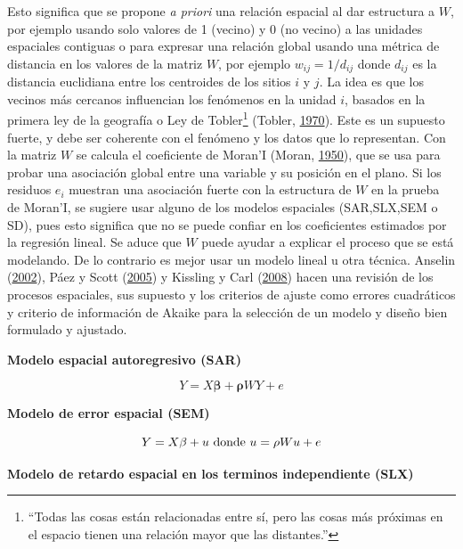 \documentclass[12pt,a4paper,oneside, openany]{book}
\let\rmarkdownfootnote\footnote%
\def\footnote{\protect\rmarkdownfootnote}
\theoremstyle{definition}
\theoremstyle{definition}
\theoremstyle{definition}
\theoremstyle{remark}
\begin{document}
Esto significa que se propone \emph{a priori} una relación espacial al
dar estructura a \(W\), por ejemplo usando solo valores de 1 (vecino) y
0 (no vecino) a las unidades espaciales contiguas o para expresar una
relación global usando una métrica de distancia en los valores de la
matriz \(W\), por ejemplo \(w_{ij}= 1/d_{ij}\) donde \(d_{ij}\) es la
distancia euclidiana entre los centroides de los sitios \(i\) y \(j\).
La idea es que los vecinos más cercanos influencian los fenómenos en la
unidad \(i\), basados en la primera ley de la geografía o Ley de
Tobler\footnote{``Todas las cosas están relacionadas entre sí, pero las
  cosas más próximas en el espacio tienen una relación mayor que las
  distantes.''} (Tobler,
\protect\hyperlink{ref-tobler1970computer}{1970}). Este es un supuesto
fuerte, y debe ser coherente con el fenómeno y los datos que lo
representan. Con la matriz \(W\) se calcula el coeficiente de Moran'I
(Moran, \protect\hyperlink{ref-moran1950notes}{1950}), que se usa para
probar una asociación global entre una variable y su posición en el
plano. Si los residuos \(e_i\) muestran una asociación fuerte con la
estructura de \(W\) en la prueba de Moran'I, se sugiere usar alguno de
los modelos espaciales (SAR,SLX,SEM o SD), pues esto significa que no se
puede confiar en los coeficientes estimados por la regresión lineal. Se
aduce que \(W\) puede ayudar a explicar el proceso que se está
modelando. De lo contrario es mejor usar un modelo lineal u otra
técnica. Anselin (\protect\hyperlink{ref-anselin_under_2002}{2002}),
Páez y Scott (\protect\hyperlink{ref-paez_spatial_2005}{2005}) y
Kissling y Carl (\protect\hyperlink{ref-kissling_spatial_2008}{2008})
hacen una revisión de los procesos espaciales, sus supuesto y los
criterios de ajuste como errores cuadráticos y criterio de información
de Akaike para la selección de un modelo y diseño bien formulado y
ajustado.

\textbf{Modelo espacial autoregresivo (SAR)}

\begin{equation}
Y=X\mathbf{\beta}+\mathbf{\rho}WY+e
\label{eq:sar}
\end{equation}

\textbf{Modelo de error espacial (SEM)}

\begin{equation}
Y=X\mathbf{\beta}+u \textrm{ donde } \\
u=\mathbf{\rho}Wu+e
\label{eq:sem}
\end{equation}

\textbf{Modelo de retardo espacial en los terminos independiente (SLX)}
\end{document}
